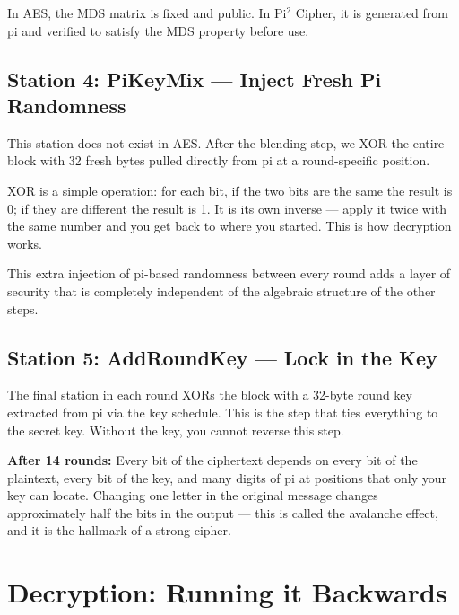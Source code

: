 \documentclass[12pt, a4paper]{article}
\begin{document}
In AES, the MDS matrix is fixed and public. In Pi$^2$ Cipher, it is generated from pi and verified to satisfy the MDS property before use.

\subsection{Station 4: PiKeyMix --- Inject Fresh Pi Randomness}

This station does not exist in AES. After the blending step, we XOR the entire block with 32 fresh bytes pulled directly from pi at a round-specific position.

XOR is a simple operation: for each bit, if the two bits are the same the result is 0; if they are different the result is 1. It is its own inverse --- apply it twice with the same number and you get back to where you started. This is how decryption works.

This extra injection of pi-based randomness between every round adds a layer of security that is completely independent of the algebraic structure of the other steps.

\subsection{Station 5: AddRoundKey --- Lock in the Key}

The final station in each round XORs the block with a 32-byte round key extracted from pi via the key schedule. This is the step that ties everything to the secret key. Without the key, you cannot reverse this step.

\begin{bluebox}
\textbf{After 14 rounds:} Every bit of the ciphertext depends on every bit of the plaintext, every bit of the key, and many digits of pi at positions that only your key can locate. Changing one letter in the original message changes approximately half the bits in the output --- this is called the avalanche effect, and it is the hallmark of a strong cipher.
\end{bluebox}

\section{Decryption: Running it Backwards}

\vspace{0.5em}
\end{document}
